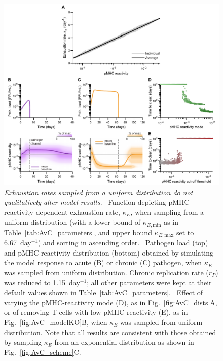 \begin{figure}
    \centering
    \includegraphics[width=\textwidth]{Figures/AvC/figS6_uniformExhaustion.pdf}
    \caption[Exhaustion rates sampled from a uniform distribution do not qualitatively alter model results]{\textit{Exhaustion rates sampled from a uniform distribution do not qualitatively alter model results}. %
    ~Function depicting pMHC reactivity-dependent exhaustion rate, $\kappa_E$, when sampling from a uniform distribution (with a lower bound of $\kappa_{E,\textrm{min}}$ as in Table~\ref{tab:AvC_parameters}, and upper bound $\kappa_{E,\textrm{max}}$ set to 6.67~day$^{-1}$) and sorting in ascending order. %
    ~Pathogen load (top) and pMHC-reactivity distribution (bottom) obtained by simulating the model response to acute (B) or chronic (C) pathogen, when $\kappa_E$ was sampled from uniform distribution. Chronic replication rate ($r_P$) was reduced to 1.15~day$^{-1}$; all other parameters were kept at their default values shown in Table~\ref{tab:AvC_parameters}. %
    ~Effect of varying the pMHC-reactivity mode (D), as in Fig.~\ref{fig:AvC_dists}A, or of removing T cells with low pMHC-reactivity (E), as in Fig.~\ref{fig:AvC_modelKO}B, when $\kappa_E$ was sampled from uniform distribution. Note that all results are consistent with those obtained by sampling $\kappa_E$ from an exponential distribution as shown in Fig.~\ref{fig:AvC_scheme}C.}
    \label{fig:AvC_supp_uniformExhaustion}
\end{figure}

